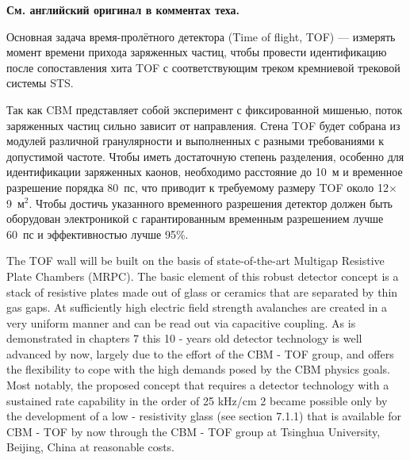 \textbf{См. английский оригинал в комментах теха.}


Основная задача время-пролётного детектора (Time of flight, TOF) --- измерять момент времени прихода заряженных частиц, чтобы провести идентификацию после сопоставления хита TOF с соответствующим треком кремниевой трековой системы STS.


Так как CBM представляет собой эксперимент с фиксированной мишенью, поток заряженных частиц сильно зависит от направления. Стена TOF будет собрана из модулей различной гранулярности и выполненных с разными требованиями к допустимой частоте. Чтобы иметь достаточную степень разделения, особенно для идентификации заряженных каонов, необходимо расстояние до 10~м и временное разрешение порядка 80~пс, что приводит к требуемому размеру TOF около 12$\times$9~м$^2$. Чтобы достичь указанного временного разрешения детектор должен быть оборудован электроникой с гарантированным временным разрешением лучше 60~пс и эффективностью лучше 95\%.


The TOF wall will be built on the basis of state-of-the-art Multigap Resistive Plate Chambers (MRPC). The basic element of this robust detector concept is a stack of resistive plates made out of glass or ceramics that are separated by thin gas gaps. At sufficiently high electric field strength avalanches are created in a very uniform manner and can be read out via capacitive coupling. As is demonstrated in chapters 7 this 10 - years old detector technology is well advanced by now, largely due to the effort of the CBM - TOF group, and offers the flexibility to cope with the high demands posed by the CBM physics goals. Most notably, the proposed concept that requires a detector technology with a sustained rate capability in the order of 25 kHz/cm 2 became possible only by the development of a low - resistivity glass (see section 7.1.1) that is available for CBM - TOF by now through the CBM - TOF group at Tsinghua University, Beijing, China at reasonable costs.

